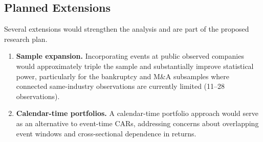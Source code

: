 \subsection{Planned Extensions}

Several extensions would strengthen the analysis and are part of the proposed research plan.

\begin{enumerate}
\item \textbf{Sample expansion.} Incorporating events at public observed companies would approximately triple the sample and substantially improve statistical power, particularly for the bankruptcy and M\&A subsamples where connected same-industry observations are currently limited (11--28 observations).

\item \textbf{Calendar-time portfolios.} A calendar-time portfolio approach would serve as an alternative to event-time CARs, addressing concerns about overlapping event windows and cross-sectional dependence in returns.


\end{enumerate}

